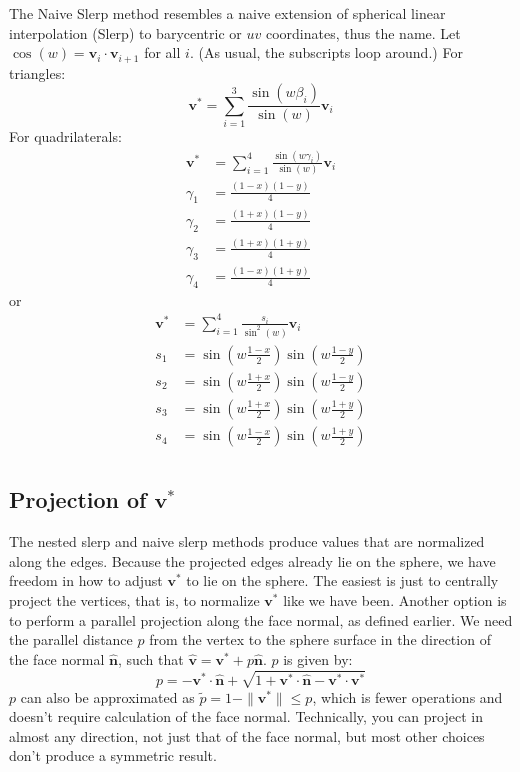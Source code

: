 \documentclass{amsart}[12pt]
\begin{document}
The Naive Slerp method resembles a naive extension of spherical linear
interpolation (Slerp) to barycentric or $uv$ coordinates, thus the
name. Let $\cos(w) = \mathbf v_i \cdot \mathbf v_{i+1}$ for all $i$. (As
usual, the subscripts loop around.) For triangles:
\begin{equation}
   \mathbf v^* = \sum_{i=1}^3\frac{\sin(w\beta_i)}{\sin(w)}  \mathbf v_i
\end{equation}
For quadrilaterals:
\begin{equation}\begin{split}
     \mathbf v^* & = \sum_{i=1}^4\frac{\sin(w\gamma_i)}{\sin(w)} \mathbf v_i \\
\gamma_1 & = \frac{(1-x)(1-y)}{4} \\
\gamma_2 & = \frac{(1+x)(1-y)}{4} \\
\gamma_3 & = \frac{(1+x)(1+y)}{4} \\
\gamma_4 & = \frac{(1-x)(1+y)}{4}
\end{split}\end{equation}
or
\begin{equation}\begin{split}
   \mathbf v^* & = \sum_{i=1}^4\frac{s_i}{\sin^2(w)}  \mathbf v_i \\
s_1 & = \sin \left(w\frac{1-x}{2}\right)\sin \left(w\frac{1-y}{2}\right) \\
s_2 & = \sin \left(w\frac{1+x}{2}\right)\sin \left(w\frac{1-y}{2}\right) \\
s_3 & = \sin \left(w\frac{1+x}{2}\right)\sin \left(w\frac{1+y}{2}\right) \\
s_4 & = \sin \left(w\frac{1-x}{2}\right)\sin \left(w\frac{1+y}{2}\right) \\
\end{split}\end{equation}

\subsection{Projection of $\mathbf v^*$}
The nested slerp and naive slerp methods produce values that are normalized
along the edges. Because the projected edges already lie on the sphere, we have
freedom in how to adjust $\mathbf v^*$ to lie on the sphere. The easiest is
just to centrally project the vertices, that is, to normalize $\mathbf v^*$
like we have been. Another option is to perform a parallel projection along the
face normal, as defined earlier. We need the parallel distance $p$ from the
vertex to the sphere surface in the direction of the face normal
$\hat{\mathbf n}$, such that $\hat{\mathbf v} =
\mathbf v^* + p\hat{\mathbf n}$. $p$ is given by:
\begin{equation}
   p = -\mathbf v^* \cdot \hat{\mathbf n} +
   \sqrt{1+\mathbf v^* \cdot \hat{\mathbf n}-\mathbf v^* \cdot \mathbf v^*}
\end{equation}
$p$ can also be approximated as $\widetilde{p} = 1 - \|\mathbf v^*\|
\leq p$, which is fewer operations and doesn't require
calculation of the face normal. Technically, you can project in almost any
direction, not just that of the face normal, but most other choices don't
produce a symmetric result.
\end{document}
